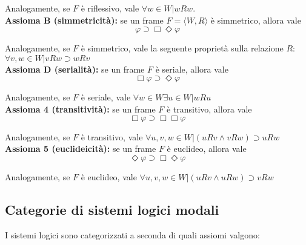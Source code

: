 Analogamente, se $F$ è riflessivo, vale $\forall w \in W | wRw$.
\\

\textbf{Assioma B (simmetricità):} se un frame $F = \langle W, R \rangle$ è simmetrico, allora vale $$\varphi \supset \Box \Diamond \varphi$$

Analogamente, se $F$ è simmetrico, vale la seguente proprietà sulla relazione $R$: $\forall v, w \in W | vRw \supset wRv$
\\

\textbf{Assioma D (serialità):} se un frame $F$ è seriale, allora vale $$\Box \varphi \supset \Diamond \varphi$$

Analogamente, se $F$ è seriale, vale $\forall w \in W \exists u \in W | wRu$
\\

\textbf{Assioma 4 (transitività):} se un frame $F$ è transitivo, allora vale $$\Box \varphi \supset \Box \Box \varphi$$

Analogamente, se $F$ è transitivo, vale $\forall u, v, w \in W  | (uRv \land vRw) \supset uRw$
\\

\textbf{Assioma 5 (euclideicità):} se un frame $F$ è euclideo, allora vale $$\Diamond \varphi \supset \Box \Diamond \varphi$$

Analogamente, se $F$ è euclideo, vale $\forall u, v, w \in W  | (uRv \land uRw) \supset vRw$
\\

\subsection{Categorie di sistemi logici modali}

I sistemi logici sono categorizzati a seconda di quali assiomi valgono:
\\

